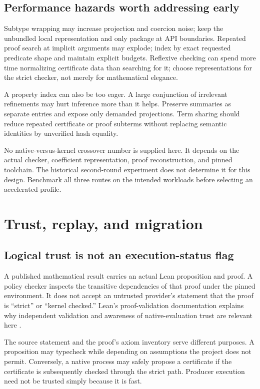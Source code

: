 \documentclass[11pt,letterpaper]{article}
\theoremstyle{definition}\newtheorem{definition}[theorem]{Definition}
\begin{document}
\subsection{Performance hazards worth addressing early}
Subtype wrapping may increase projection and coercion noise; keep the unbundled local representation and only package at API boundaries. Repeated proof search at implicit arguments may explode; index by exact requested predicate shape and maintain explicit budgets. Reflexive checking can spend more time normalizing certificate data than searching for it; choose representations for the strict checker, not merely for mathematical elegance.

A property index can also be too eager. A large conjunction of irrelevant refinements may hurt inference more than it helps. Preserve summaries as separate entries and expose only demanded projections. Term sharing should reduce repeated certificate or proof subterms without replacing semantic identities by unverified hash equality.

No native-versus-kernel crossover number is supplied here. It depends on the actual checker, coefficient representation, proof reconstruction, and pinned toolchain. The historical second-round experiment does not determine it for this design. Benchmark all three routes on the intended workloads before selecting an accelerated profile.

\section{Trust, replay, and migration}\label{sec:trust}
\subsection{Logical trust is not an execution-status flag}
A published mathematical result carries an actual Lean proposition and proof. A policy checker inspects the transitive dependencies of that proof under the pinned environment. It does not accept an untrusted provider's statement that the proof is ``strict'' or ``kernel checked.'' Lean's proof-validation documentation explains why independent validation and awareness of native-evaluation trust are relevant here \cite{leanValidation}.

The source statement and the proof's axiom inventory serve different purposes. A proposition may typecheck while depending on assumptions the project does not permit. Conversely, a native process may safely propose a certificate if the certificate is subsequently checked through the strict path. Producer execution need not be trusted simply because it is fast.
\end{document}
